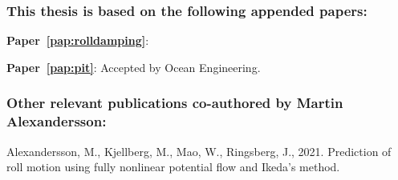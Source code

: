 

\subsubsection*{\normalfont \color{black} \textbf{This thesis is based on the following appended papers:}}

\noindent\begin{minipage}[adjusting]{\linewidth}
\textbf{Paper~\ref{pap:rolldamping}}: 
\end{minipage}
\vspace{0.25cm}
\newline
\noindent\begin{minipage}[adjusting]{\linewidth}
\textbf{Paper~\ref{pap:pit}}: 
Accepted by Ocean Engineering.
\end{minipage}

\subsubsection*{\normalfont \color{black} \textbf{Other relevant publications co-authored by Martin Alexandersson:}} 
\normalsize
\newcommand{\ME}{{\bfseries Martin Alexandersson}}

\noindent\begin{minipage}[adjusting]{\linewidth}
\end{minipage}
\vspace{0.25cm}
\newline
\noindent\begin{minipage}[adjusting]{\linewidth}
Alexandersson, M., Kjellberg, M., Mao, W., Ringsberg, J., 2021. Prediction of roll motion using fully nonlinear potential flow and Ikeda’s method.
\end{minipage}

